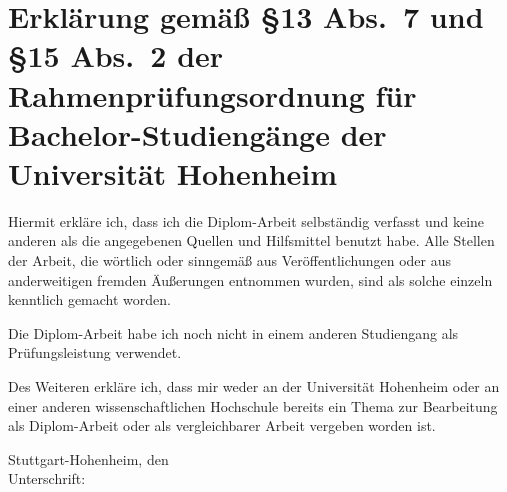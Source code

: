 \newpage


\section*{Erklärung gemäß §13 Abs.~7 und §15 Abs.~2  der Rahmenprüfungsordnung für Bachelor-Studiengänge der
Universität Hohenheim}

Hiermit erkläre ich, dass ich die Diplom-Arbeit selbständig verfasst und keine anderen als die
angegebenen Quellen und Hilfsmittel benutzt habe. Alle Stellen der Arbeit, die wörtlich oder
sinngemäß aus Veröffentlichungen oder aus anderweitigen fremden Äußerungen entnommen wurden, sind
als solche einzeln kenntlich gemacht worden.

Die Diplom-Arbeit habe ich noch nicht in einem anderen Studiengang als Prüfungsleistung verwendet.

Des Weiteren erkläre ich, dass mir weder an der Universität Hohenheim oder an einer anderen
wissenschaftlichen Hochschule bereits ein Thema zur Bearbeitung als Diplom-Arbeit oder als
vergleichbarer Arbeit vergeben worden ist.


\begin{tabbing}
Stuttgart-Hohenheim, den \qquad\= \underline{\hspace{9cm}} \\[2em]
Unterschrift: \> \underline{\hspace{9cm}}
\end{tabbing}





